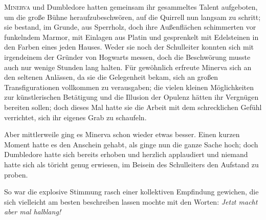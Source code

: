 
\lettrine{M}{inerva} und Dumbledore hatten gemeinsam ihr gesammeltes Talent aufgeboten, um die große Bühne heraufzubeschwören, auf die Quirrell nun langsam zu schritt; sie bestand, im Grunde, aus Sperrholz, doch ihre Außenflächen schimmerten vor funkelndem Marmor, mit Einlagen aus Platin und gesprenkelt mit Edelsteinen in den Farben eines jeden Hauses. Weder sie noch der Schulleiter konnten sich mit irgendeinem der Gründer von Hogwarts messen, doch die Beschwörung musste auch nur wenige Stunden lang halten. Für gewöhnlich erfreute Minerva sich an den seltenen Anlässen, da sie die Gelegenheit bekam, sich an großen Transfigurationen vollkommen zu verausgaben; die vielen kleinen Möglichkeiten zur künstlerischen Betätigung und die Illusion der Opulenz hätten ihr Vergnügen bereiten sollen; doch dieses Mal hatte sie die Arbeit mit dem schrecklichen Gefühl verrichtet, sich ihr eigenes Grab zu schaufeln.

Aber mittlerweile ging es Minerva schon wieder etwas besser. Einen kurzen Moment hatte es den Anschein gehabt, als ginge nun die ganze Sache hoch; doch Dumbledore hatte sich bereits erhoben und herzlich applaudiert und niemand hatte sich als töricht genug erwiesen, im Beisein des Schulleiters den Aufstand zu proben.

So war die explosive Stimmung rasch einer kollektiven Empfindung gewichen, die sich vielleicht am besten beschreiben lassen mochte mit den Worten: \emph{Jetzt macht aber mal halblang!}

